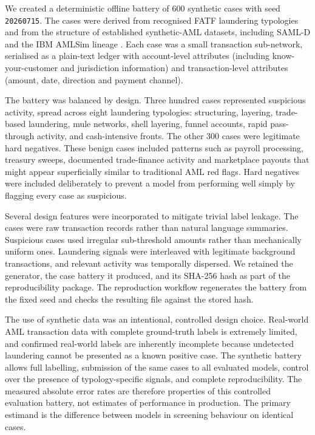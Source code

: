 \documentclass[pdflatex,sn-basic,Numbered]{sn-jnl}
\begin{document}
We created a deterministic offline battery of 600 synthetic cases with seed \texttt{20260715}. The cases were derived from recognised FATF laundering typologies and from the structure of established synthetic-AML datasets, including SAML-D and the IBM AMLSim lineage \cite{samld,weber2018}. Each case was a small transaction sub-network, serialised as a plain-text ledger with account-level attributes (including know-your-customer and jurisdiction information) and transaction-level attributes (amount, date, direction and payment channel).

The battery was balanced by design. Three hundred cases represented suspicious activity, spread across eight laundering typologies: structuring, layering, trade-based laundering, mule networks, shell layering, funnel accounts, rapid pass-through activity, and cash-intensive fronts. The other 300 cases were legitimate hard negatives. These benign cases included patterns such as payroll processing, treasury sweeps, documented trade-finance activity and marketplace payouts that might appear superficially similar to traditional AML red flags. Hard negatives were included deliberately to prevent a model from performing well simply by flagging every case as suspicious.

Several design features were incorporated to mitigate trivial label leakage. The cases were raw transaction records rather than natural language summaries. Suspicious cases used irregular sub-threshold amounts rather than mechanically uniform ones. Laundering signals were interleaved with legitimate background transactions, and relevant activity was temporally dispersed. We retained the generator, the case battery it produced, and its SHA-256 hash as part of the reproducibility package. The reproduction workflow regenerates the battery from the fixed seed and checks the resulting file against the stored hash.

The use of synthetic data was an intentional, controlled design choice. Real-world AML transaction data with complete ground-truth labels is extremely limited, and confirmed real-world labels are inherently incomplete because undetected laundering cannot be presented as a known positive case. The synthetic battery allows full labelling, submission of the same cases to all evaluated models, control over the presence of typology-specific signals, and complete reproducibility. The measured absolute error rates are therefore properties of this controlled evaluation battery, not estimates of performance in production. The primary estimand is the difference between models in screening behaviour on identical cases.
\end{document}
